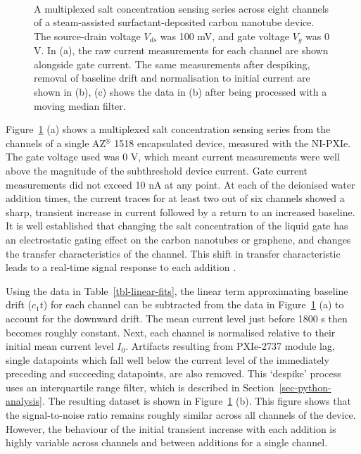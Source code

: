 \documentclass[
  a4paper,
]{scrbook}
\begin{document}
\begin{figure}
\begin{minipage}[t]{0.70\linewidth}
{{}

}

\end{minipage}%
%
\begin{minipage}[t]{0.15\linewidth}

{\centering 

~

}

\end{minipage}%

\caption{\label{fig-salt-conc-sensing}A multiplexed salt concentration
sensing series across eight channels of a steam-assisted
surfactant-deposited carbon nanotube device. The source-drain voltage
\(V_{ds}\) was 100 mV, and gate voltage \(V_g\) was 0 V. In (a), the raw
current measurements for each channel are shown alongside gate current.
The same measurements after despiking, removal of baseline drift and
normalisation to initial current are shown in (b), (c) shows the data in
(b) after being processed with a moving median filter.}

\end{figure}

Figure~\ref{fig-salt-conc-sensing} (a) shows a multiplexed salt
concentration sensing series from the channels of a single
AZ\(^\circledR\) 1518 encapsulated device, measured with the NI-PXIe.
The gate voltage used was 0 V, which meant current measurements were
well above the magnitude of the subthreshold device current. Gate
current measurements did not exceed 10 nA at any point. At each of the
deionised water addition times, the current traces for at least two out
of six channels showed a sharp, transient increase in current followed
by a return to an increased baseline. It is well established that
changing the salt concentration of the liquid gate has an electrostatic
gating effect on the carbon nanotubes or graphene, and changes the
transfer characteristics of the channel. This shift in transfer
characteristic leads to a real-time signal response to each addition
\autocite{Heller2009,Heller2010,Kireev2017}.

Using the data in Table~\ref{tbl-linear-fits}, the linear term
approximating baseline drift (\(c_1t\)) for each channel can be
subtracted from the data in Figure~\ref{fig-salt-conc-sensing} (a) to
account for the downward drift. The mean current level just before 1800
s then becomes roughly constant. Next, each channel is normalised
relative to their initial mean current level \(I_{0}\). Artifacts
resulting from PXIe-2737 module lag, single datapoints which fall well
below the current level of the immediately preceding and succeeding
datapoints, are also removed. This `despike' process uses an
interquartile range filter, which is described in
Section~\ref{sec-python-analysis}. The resulting dataset is shown in
Figure~\ref{fig-salt-conc-sensing} (b). This figure shows that the
signal-to-noise ratio remains roughly similar across all channels of the
device. However, the behaviour of the initial transient increase with
each addition is highly variable across channels and between additions
for a single channel.
\end{document}
